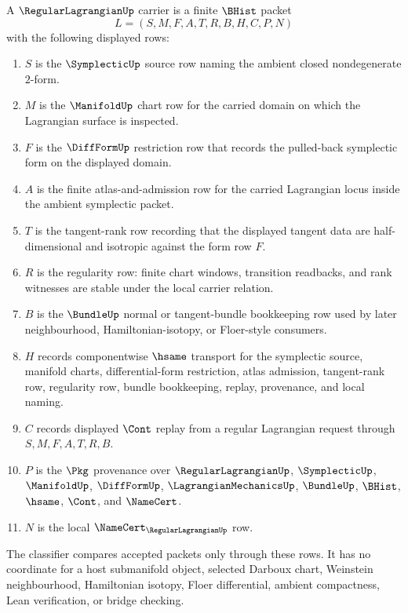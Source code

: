 \begin{definition}
\label{def:regular-lagrangian-carrier}
A $\RegularLagrangianUp$ carrier is a finite $\BHist$ packet
$$
L=(S,M,F,A,T,R,B,H,C,P,N)
$$
with the following displayed rows:
\begin{enumerate}
\item $S$ is the $\SymplecticUp$ source row naming the ambient closed nondegenerate $2$-form.
\item $M$ is the $\ManifoldUp$ chart row for the carried domain on which the Lagrangian surface is inspected.
\item $F$ is the $\DiffFormUp$ restriction row that records the pulled-back symplectic form on the displayed domain.
\item $A$ is the finite atlas-and-admission row for the carried Lagrangian locus inside the ambient symplectic packet.
\item $T$ is the tangent-rank row recording that the displayed tangent data are half-dimensional and isotropic against the form row $F$.
\item $R$ is the regularity row: finite chart windows, transition readbacks, and rank witnesses are stable under the local carrier relation.
\item $B$ is the $\BundleUp$ normal or tangent-bundle bookkeeping row used by later neighbourhood, Hamiltonian-isotopy, or Floer-style consumers.
\item $H$ records componentwise $\hsame$ transport for the symplectic source, manifold charts, differential-form restriction, atlas admission, tangent-rank row, regularity row, bundle bookkeeping, replay, provenance, and local naming.
\item $C$ records displayed $\Cont$ replay from a regular Lagrangian request through $S,M,F,A,T,R,B$.
\item $P$ is the $\Pkg$ provenance over $\RegularLagrangianUp$, $\SymplecticUp$, $\ManifoldUp$, $\DiffFormUp$, $\LagrangianMechanicsUp$, $\BundleUp$, $\BHist$, $\hsame$, $\Cont$, and $\NameCert$.
\item $N$ is the local $\NameCert_{\RegularLagrangianUp}$ row.
\end{enumerate}
The classifier compares accepted packets only through these rows. It has no coordinate for a host submanifold object, selected Darboux chart, Weinstein neighbourhood, Hamiltonian isotopy, Floer differential, ambient compactness, Lean verification, or bridge checking.
\end{definition}

